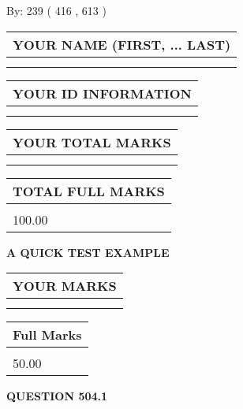 \documentclass[12pt]{article}
\begin{document}
   
\hspace{1.0in} By: 
 239 ( 416 ,  613 )
   
   
   
   
\newpage 
\setcounter{page}{ 
   504001 } 
   
   
   
   
\noindent\begin{tabular}{|l|}
\hline
YOUR NAME (FIRST, ... LAST)  \\
\hline
 \\ 
 \\ 
\hline
\end{tabular}
\hspace{0.05in} \begin{tabular}{|l|}
\hline
 YOUR   ID   INFORMATION  \\
\hline
 \\ 
 \\ 
\hline
\end{tabular}
   
   
\vspace{0.2in}\noindent\begin{tabular}{|l|}
\hline
YOUR TOTAL MARKS  \\
\hline
 \\ 
 \\ 
\hline
\end{tabular}
\hspace{0.05in} \begin{tabular}{|l|}
\hline
TOTAL FULL MARKS  \\
\hline
 \\ 
100.00 \\
\hline
\end{tabular}
   
   
 \vspace{0.2in}
{\LARGE {\textbf{ A QUICK TEST EXAMPLE}}}
   
   
  
\vspace{0.2in}
  
\noindent\begin{tabular}{|l|}
\hline
 YOUR MARKS  \\
\hline
 \\ 
 \\ 
\hline
\end{tabular}
\hspace{0.05in} \begin{tabular}{|l|}
\hline
 Full Marks  \\
\hline
 \\ 
50.00 \\
\hline
\end{tabular}
{\textbf{\Large{QUESTION
504.1 
}}}
  
\end{document}
